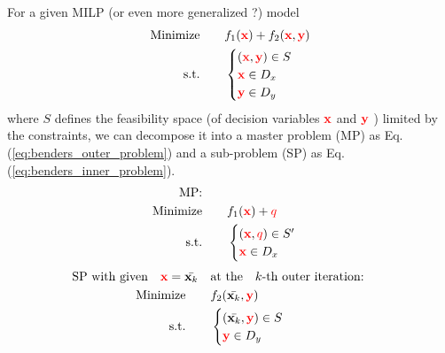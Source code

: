 \documentclass[twocolumn]{ctexart}
\begin{document}
For a given MILP (or even more generalized ?) model
\begin{equation}
    \begin{aligned}
        \label{eq:benders_total_problem}
        \text{Minimize} \qquad &
            f_1(  \mathbf{\color{red} x}  ) + f_2(  \mathbf{\color{red} x}  ,  \mathbf{\color{red} y}  )
        \\
        \text{s.t.} \qquad &
            \begin{cases}
                (  \mathbf{\color{red} x}  ,  \mathbf{\color{red} y}  ) \in S
                \\
                \mathbf{\color{red} x}  \in  D_x
                \\
                \mathbf{\color{red} y}  \in  D_y
            \end{cases}
    \end{aligned}
\end{equation}
where $S$ defines the feasibility space (of decision variables $\mathbf{\color{red} x}$ and $\mathbf{\color{red} y}$ ) limited by the constraints,
we can decompose it into a master problem (MP) as Eq.(\ref{eq:benders_outer_problem}) and a sub-problem (SP) as Eq.(\ref{eq:benders_inner_problem}).
\begin{equation}
    \begin{aligned}
        \label{eq:benders_outer_problem}
        \text{MP:} \qquad &
        \\
        \text{Minimize} \qquad &
            f_1(  \mathbf{\color{red} x}  ) + {\color{red} q}
        \\
        \text{s.t.} \qquad &
            \begin{cases}
                (  \mathbf{\color{red} x}  ,  {\color{red} q}  ) \in S'
                \\
                \mathbf{\color{red} x}  \in  D_x
            \end{cases}
    \end{aligned}
\end{equation}
\begin{equation}
    \begin{aligned}
        \label{eq:benders_inner_problem}
        \text{SP with given} \quad \mathbf{\color{red} x} = \bar{\mathbf{x}_k} \quad & \text{at the} \quad k \text{-th outer iteration:} \qquad
        \\
        \text{Minimize} \qquad &
            f_2(  \bar{\mathbf{x}_k}  ,  \mathbf{\color{red} y}  )
        \\
        \text{s.t.} \qquad &
            \begin{cases}
                (  \bar{\mathbf{x}_k}  ,  \mathbf{\color{red} y}  ) \in S
                \\
                \mathbf{\color{red} y}  \in  D_y
            \end{cases}
    \end{aligned}
\end{equation}
\end{document}
